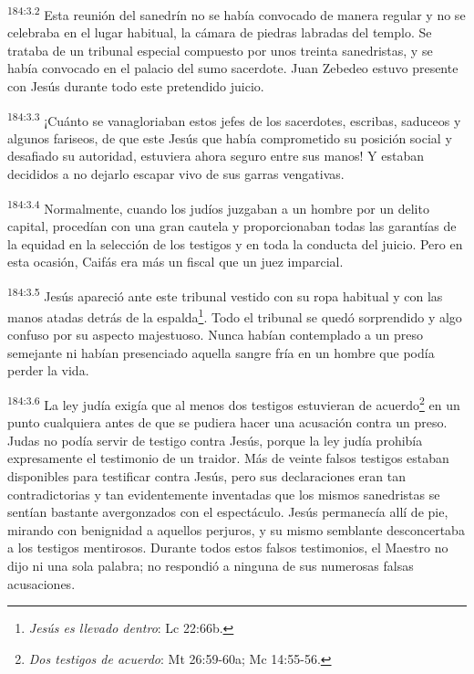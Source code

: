 \par
\textsuperscript{184:3.2} Esta reunión del sanedrín no se había convocado de manera regular y no se celebraba en el lugar habitual, la cámara de piedras labradas del templo. Se trataba de un tribunal especial compuesto por unos treinta sanedristas, y se había convocado en el palacio del sumo sacerdote. Juan Zebedeo estuvo presente con Jesús durante todo este pretendido juicio.

\par
\textsuperscript{184:3.3} ¡Cuánto se vanagloriaban estos jefes de los sacerdotes, escribas, saduceos y algunos fariseos, de que este Jesús que había comprometido su posición social y desafiado su autoridad, estuviera ahora seguro entre sus manos! Y estaban decididos a no dejarlo escapar vivo de sus garras vengativas.

\par
\textsuperscript{184:3.4} Normalmente, cuando los judíos juzgaban a un hombre por un delito capital, procedían con una gran cautela y proporcionaban todas las garantías de la equidad en la selección de los testigos y en toda la conducta del juicio. Pero en esta ocasión, Caifás era más un fiscal que un juez imparcial.

\par
\textsuperscript{184:3.5} Jesús apareció ante este tribunal vestido con su ropa habitual y con las manos atadas detrás de la espalda\footnote{\textit{Jesús es llevado dentro}: Lc 22:66b.}. Todo el tribunal se quedó sorprendido y algo confuso por su aspecto majestuoso. Nunca habían contemplado a un preso semejante ni habían presenciado aquella sangre fría en un hombre que podía perder la vida.

\par
\textsuperscript{184:3.6} La ley judía exigía que al menos dos testigos estuvieran de acuerdo\footnote{\textit{Dos testigos de acuerdo}: Mt 26:59-60a; Mc 14:55-56.} en un punto cualquiera antes de que se pudiera hacer una acusación contra un preso. Judas no podía servir de testigo contra Jesús, porque la ley judía prohibía expresamente el testimonio de un traidor. Más de veinte falsos testigos estaban disponibles para testificar contra Jesús, pero sus declaraciones eran tan contradictorias y tan evidentemente inventadas que los mismos sanedristas se sentían bastante avergonzados con el espectáculo. Jesús permanecía allí de pie, mirando con benignidad a aquellos perjuros, y su mismo semblante desconcertaba a los testigos mentirosos. Durante todos estos falsos testimonios, el Maestro no dijo ni una sola palabra; no respondió a ninguna de sus numerosas falsas acusaciones.

